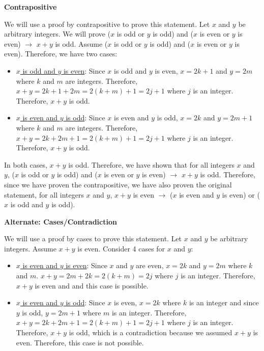 \documentclass[12pt]{exam}
\begin{document}
\begin{solution}
\begin{qparts}
    \item \textbf{Contrapositive}
    
    We will use a proof by contrapositive to prove this statement. Let $x$ and $y$ be arbitrary integers. We will prove ($x$ is odd or $y$ is odd) and ($x$ is even or $y$ is even) $\rightarrow$ $x + y$ is odd. Assume ($x$ is odd or $y$ is odd) and ($x$ is even or $y$ is even). Therefore, we have two cases:
        \begin{itemize}
            \item \underline{$x$ is odd and $y$ is even}: Since $x$ is odd and $y$ is even, $x = 2k + 1$ and $y = 2m$ where $k$ and $m$ are integers. Therefore, $x + y = 2k + 1 + 2m = 2(k + m) + 1 = 2j + 1$ where $j$ is an integer. Therefore, $x + y$ is odd.

            \item \underline{$x$ is even and $y$ is odd}: Since $x$ is even and $y$ is odd, $x = 2k$ and $y = 2m + 1$ where $k$ and $m$ are integers. Therefore, $x + y = 2k + 2m + 1 = 2(k + m) + 1 = 2j + 1$ where $j$ is an integer. Therefore, $x + y$ is odd.
        \end{itemize}
        In both cases, $x + y$ is odd. Therefore, we have shown that for all integers $x$ and $y$, ($x$ is odd or $y$ is odd) and ($x$ is even or $y$ is even) $\rightarrow$ $x + y$ is odd. Therefore, since we have proven the contrapositive, we have also proven the original statement, for all integers $x$ and $y$, $x + y$ is even $\rightarrow$ ($x$ is even and $y$ is even) or ($x$ is odd and $y$ is odd).
        
    \textbf{Alternate: Cases/Contradiction}

    We will use a proof by cases to prove this statement. Let $x$ and $y$ be arbitrary integers. Assume $x + y$ is even. Consider 4 cases for $x$ and $y$:
    \begin{itemize}
        \item \underline{$x$ is even and $y$ is even}: Since $x$ and $y$ are even, $x = 2k$ and $y = 2m$ where $k$ and $m$. $x + y = 2m + 2k = 2(k + m) = 2j$ where $j$ is an integer. Therefore, $x + y$ is even and and this case is possible.

        \item \underline{$x$ is even and $y$ is odd}: Since $x$ is even, $x = 2k$ where $k$ is an integer and since $y$ is odd, $y = 2m + 1$ where $m$ is an integer. Therefore, $x + y = 2k + 2m + 1 = 2(k + m) + 1 = 2j + 1$ where $j$ is an integer. Therefore, $x + y$ is odd, which is a contradiction because we assumed $x + y$ is even. Therefore, this case is not possible.


\end{itemize}
\end{qparts}
\end{solution}
\end{document}
